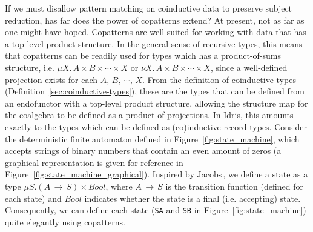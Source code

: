 

\label{sec:prod-vs.-copr}
If we must disallow pattern matching on coinductive data to preserve subject
reduction, has far does the power of copatterns extend? At present, not as far
as one might have hoped. Copatterns are well-suited for working with data that
has a top-level product structure. In the general sense of recursive types, this
means that copatterns can be readily used for types which has a product-of-sums
structure, i.e. ${\mu X.\,A\times B\times\cdots\times X}$ or
${\nu X.\,A\times B\times\cdots\times X}$, since a well-defined projection
exists for each $A,\,B,\,\cdots,\,X$. From the definition of coinductive types
(Definition~\ref{sec:coinductive-types}), these are the types that can be
defined from an endofunctor with a top-level product structure, allowing the
structure map for the coalgebra to be defined as a product of projections. In
Idris, this amounts exactly to the types which can be defined as (co)inductive
record types. Consider the deterministic finite automaton defined in
Figure~\ref{fig:state_machine}, which accepts strings of binary numbers that
contain an even amount of zeros (a graphical representation is given for
reference in Figure~\ref{fig:state_machine_graphical}). Inspired by
Jacobs\,\citep{JacobsCoalgebra}, we define a state as a type
${\mu S. (A\,\to\,S)\times Bool}$, where $A\,\to\,S$ is the transition function
(defined for each state) and $Bool$ indicates whether the state is a final
(i.e. accepting) state. Consequently, we can define each state (\texttt{SA} and
\texttt{SB} in Figure~\ref{fig:state_machine}) quite elegantly using copatterns.


